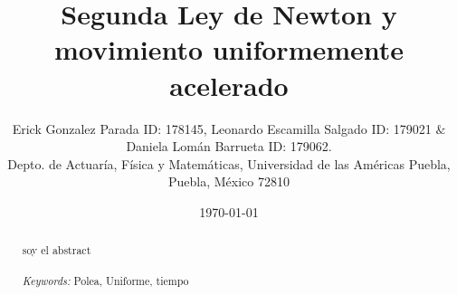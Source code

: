\documentclass{article}
\begin{document}

\renewcommand{\footrulewidth}{1pt}
\renewcommand{\tablename}{Tabla}
\renewcommand{\figurename}{Figura}


\title{Segunda Ley de Newton y movimiento uniformemente acelerado}
\author{\small{Erick Gonzalez Parada ID: 178145, Leonardo Escamilla Salgado ID: 179021 $\&$ Daniela Lomán Barrueta ID: 179062.}\\		%
	   \small{Depto. de Actuaría, Física y Matemáticas, Universidad de las Américas Puebla, Puebla, M\'exico 72810}}
\date{\small{\today}}

\maketitle


\begin{abstract}

	soy el abstract
\\
\\
{\it Keywords:}  Polea, Uniforme, tiempo
\\
\\
\end{abstract}

\end{document}
